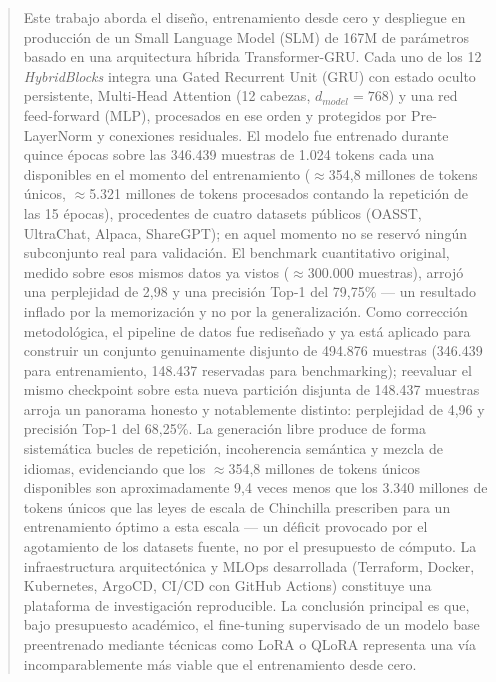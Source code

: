 \vspace*{\fill}
\begin{abstract}
    Este trabajo aborda el diseño, entrenamiento desde cero y despliegue en producción de un Small Language Model (SLM) de 167M de parámetros basado en una arquitectura híbrida Transformer-GRU. Cada uno de los 12 \textit{HybridBlocks} integra una Gated Recurrent Unit (GRU) con estado oculto persistente, Multi-Head Attention (12 cabezas, $d_{model}=768$) y una red feed-forward (MLP), procesados en ese orden y protegidos por Pre-LayerNorm y conexiones residuales. El modelo fue entrenado durante quince épocas sobre las 346.439 muestras de 1.024 tokens cada una disponibles en el momento del entrenamiento ($\approx$354,8 millones de tokens únicos, $\approx$5.321 millones de tokens procesados contando la repetición de las 15 épocas), procedentes de cuatro datasets públicos (OASST, UltraChat, Alpaca, ShareGPT); en aquel momento no se reservó ningún subconjunto real para validación. El benchmark cuantitativo original, medido sobre esos mismos datos ya vistos ($\approx$300.000 muestras), arrojó una perplejidad de 2,98 y una precisión Top-1 del 79,75\% --- un resultado inflado por la memorización y no por la generalización. Como corrección metodológica, el pipeline de datos fue rediseñado y ya está aplicado para construir un conjunto genuinamente disjunto de 494.876 muestras (346.439 para entrenamiento, 148.437 reservadas para benchmarking); reevaluar el mismo checkpoint sobre esta nueva partición disjunta de 148.437 muestras arroja un panorama honesto y notablemente distinto: perplejidad de 4,96 y precisión Top-1 del 68,25\%. La generación libre produce de forma sistemática bucles de repetición, incoherencia semántica y mezcla de idiomas, evidenciando que los $\approx$354,8 millones de tokens únicos disponibles son aproximadamente 9,4 veces menos que los 3.340 millones de tokens únicos que las leyes de escala de Chinchilla prescriben para un entrenamiento óptimo a esta escala --- un déficit provocado por el agotamiento de los datasets fuente, no por el presupuesto de cómputo. La infraestructura arquitectónica y MLOps desarrollada (Terraform, Docker, Kubernetes, ArgoCD, CI/CD con GitHub Actions) constituye una plataforma de investigación reproducible. La conclusión principal es que, bajo presupuesto académico, el fine-tuning supervisado de un modelo base preentrenado mediante técnicas como LoRA o QLoRA representa una vía incomparablemente más viable que el entrenamiento desde cero.
\end{abstract}
\vspace*{\fill}
\clearpage

